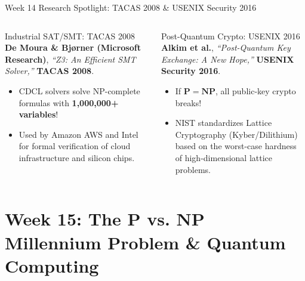 \documentclass[aspectratio=169,10pt]{beamer}
\begin{document}
\begin{frame}{Week 14 Research Spotlight: TACAS 2008 \& USENIX Security 2016}
    \begin{columns}[T]
        \begin{exampleblock}{Industrial SAT/SMT: TACAS 2008}
            \textbf{De Moura \& Bj{\o}rner (Microsoft Research)}, \textit{``Z3: An Efficient SMT Solver,''} \textbf{TACAS 2008}.
            \begin{itemize}\small
                \item CDCL solvers solve NP-complete formulas with \textbf{1,000,000+ variables}!
                \item Used by Amazon AWS and Intel for formal verification of cloud infrastructure and silicon chips.
            \end{itemize}
        \end{exampleblock}
        
        \begin{alertblock}{Post-Quantum Crypto: USENIX 2016}
            \textbf{Alkim et al.}, \textit{``Post-Quantum Key Exchange: A New Hope,''} \textbf{USENIX Security 2016}.
            \begin{itemize}\small
                \item If $\mathbf{P}=\mathbf{NP}$, all public-key crypto breaks!
                \item NIST standardizes Lattice Cryptography (Kyber/Dilithium) based on the worst-case hardness of high-dimensional lattice problems.
            \end{itemize}
        \end{alertblock}
    \end{columns}
\end{frame}

\section{Week 15: The P vs. NP Millennium Problem \& Quantum Computing}
\end{document}
